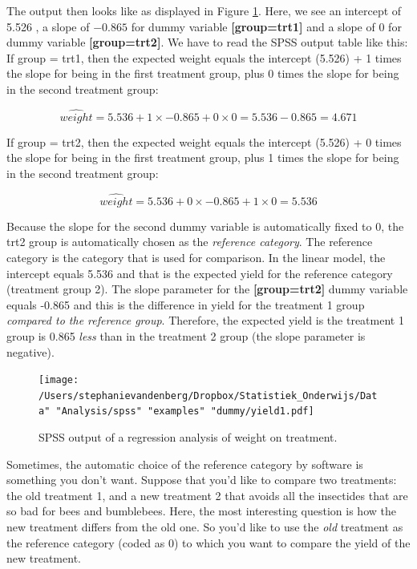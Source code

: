\documentclass[]{report}\usepackage[]{graphicx}\usepackage[]{color}
\begin{document}
The output then looks like as displayed in Figure \ref{fig:dummy_10}. Here, we see an intercept of 5.526 , a slope of $-0.865$ for dummy variable \textbf{[group=trt1]} and a slope of 0 for dummy variable \textbf{[group=trt2]}. We have to read the SPSS output table like this: If group = trt1, then the expected weight equals the intercept (5.526) + 1 times the slope for being in the first treatment group, plus 0 times the slope for being in the second treatment group:

\begin{equation}
\widehat{weight}= 5.536 + 1 \times -0.865 + 0 \times 0  = 5.536 - 0.865 = 4.671
\end{equation}

If group = trt2, then the expected weight equals the intercept (5.526) + 0 times the slope for being in the first treatment group, plus 1 times the slope for being in the second treatment group:

\begin{equation}
\widehat{weight}= 5.536 + 0 \times -0.865 + 1 \times 0  = 5.536 
\end{equation}

Because the slope for the second dummy variable is automatically fixed to 0, the trt2 group is automatically chosen as the \textit{reference category}. The reference category is the category that is used for comparison. In the linear model, the intercept equals 5.536 and that is the expected yield for the reference category (treatment group 2). The slope parameter for the \textbf{[group=trt2]} dummy variable equals -0.865 and this is the difference in yield for the treatment 1 group \textit{compared to the reference group}. Therefore, the expected yield is the treatment 1 group is 0.865 \textit{less} than in the treatment 2 group (the slope parameter is negative). 

\begin{figure}[h]
    \begin{center}
       \texttt{[image: /Users/stephanievandenberg/Dropbox/Statistiek\_Onderwijs/Data" "Analysis/spss" "examples" "dummy/yield1.pdf]}
    \end{center}
 \caption{SPSS output of a regression analysis of weight on treatment.}
 \label{fig:dummy_10}
\end{figure}

Sometimes, the automatic choice of the reference category by software is something you don't want. Suppose that you'd like to compare two treatments: the old treatment 1, and a new treatment 2 that avoids all the insectides that are so bad for bees and bumblebees. Here, the most interesting question is how the new treatment differs from the old one. So you'd like to use the \textit{old} treatment as the reference category (coded as 0) to which you want to compare the yield of the new treatment.
\end{document}
